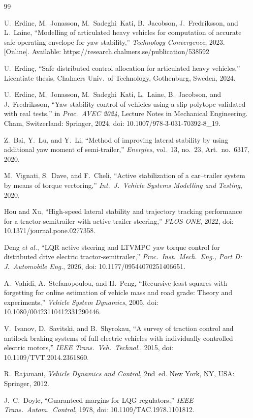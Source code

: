 \documentclass[conference]{IEEEtran}
\begin{document}
\begin{thebibliography}{99}

U.~Erdinc, M.~Jonasson, M.~Sadeghi~Kati, B.~Jacobson, J.~Fredriksson, and L.~Laine, ``Modelling of articulated heavy vehicles for computation of accurate safe operating envelope for yaw stability,'' \emph{Technology Convergence}, 2023. [Online]. Available: https://research.chalmers.se/publication/538592

U.~Erdin\c{c}, ``Safe distributed control allocation for articulated heavy vehicles,'' Licentiate thesis, Chalmers Univ.\ of Technology, Gothenburg, Sweden, 2024.

U.~Erdinc, M.~Jonasson, M.~Sadeghi~Kati, L.~Laine, B.~Jacobson, and J.~Fredriksson, ``Yaw stability control of vehicles using a slip polytope validated with real tests,'' in \emph{Proc.\ AVEC 2024}, Lecture Notes in Mechanical Engineering. Cham, Switzerland: Springer, 2024, doi: 10.1007/978-3-031-70392-8\_19.

Z.~Bai, Y.~Lu, and Y.~Li, ``Method of improving lateral stability by using additional yaw moment of semi-trailer,'' \emph{Energies}, vol.~13, no.~23, Art.~no.~6317, 2020.

M.~Vignati, S.~Dave, and F.~Cheli, ``Active stabilization of a car--trailer system by means of torque vectoring,'' \emph{Int.\ J.\ Vehicle Systems Modelling and Testing}, 2020.

Hou and Xu, ``High-speed lateral stability and trajectory tracking performance for a tractor-semitrailer with active trailer steering,'' \emph{PLOS ONE}, 2022, doi: 10.1371/journal.pone.0277358.

Deng \emph{et al.}, ``LQR active steering and LTVMPC yaw torque control for distributed drive electric tractor-semitrailer,'' \emph{Proc.\ Inst.\ Mech.\ Eng., Part D: J.\ Automobile Eng.}, 2026, doi: 10.1177/09544070251406651.

A.~Vahidi, A.~Stefanopoulou, and H.~Peng, ``Recursive least squares with forgetting for online estimation of vehicle mass and road grade: Theory and experiments,'' \emph{Vehicle System Dynamics}, 2005, doi: 10.1080/00423110412331290446.

V.~Ivanov, D.~Savitski, and B.~Shyrokau, ``A survey of traction control and antilock braking systems of full electric vehicles with individually controlled electric motors,'' \emph{IEEE Trans.\ Veh.\ Technol.}, 2015, doi: 10.1109/TVT.2014.2361860.

R.~Rajamani, \emph{Vehicle Dynamics and Control}, 2nd~ed. New York, NY, USA: Springer, 2012.

J.~C.~Doyle, ``Guaranteed margins for LQG regulators,'' \emph{IEEE Trans.\ Autom.\ Control}, 1978, doi: 10.1109/TAC.1978.1101812.

\end{thebibliography}
\end{document}
